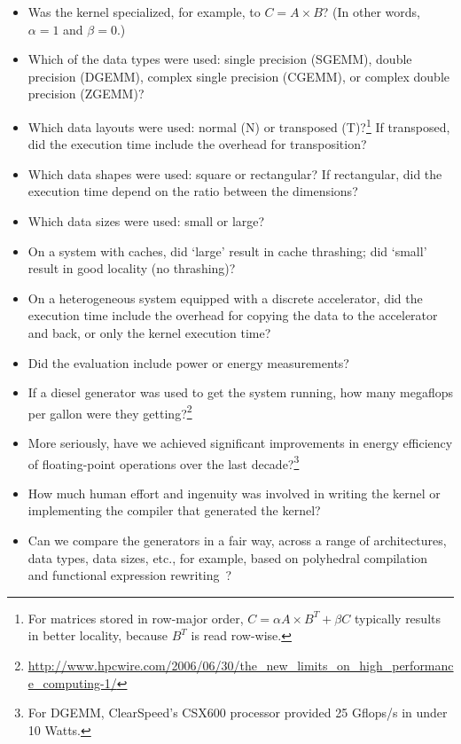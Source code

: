 \documentclass{acm_proc_article-sp} %
\begin{document}
\begin{itemize}
%
\item Was the kernel specialized, for example, to $C = A \times B$? (In other
words, $\alpha=1$ and $\beta=0$.) 
%
\item Which of the data types were used: single precision (SGEMM), double
precision (DGEMM), complex single precision (CGEMM), or complex double
precision (ZGEMM)?
%
\item Which data layouts were used: normal (N) or transposed (T)?\footnote{For
matrices stored in row-major order, $C = \alpha A \times B^{T} + \beta C$
typically results in better locality, because $B^{T}$ is read row-wise.} If
transposed, did the execution time include the overhead for transposition?
%
\item Which data shapes were used: square or rectangular? If rectangular, did
the execution time depend on the ratio between the dimensions? 
%
\item Which data sizes were used: small or large?
%
\item On a system with caches, did `large' result in cache thrashing; did
`small' result in good locality (no thrashing)?
%
\item On a heterogeneous system equipped with a discrete accelerator, did the
execution time include the overhead for copying the data to the accelerator and
back, or only the kernel execution time?
%
\item Did the evaluation include power or energy measurements?
%
\item If a diesel generator was used to get the system running, how many
megaflops per gallon were they
getting?\footnote{\url{http://www.hpcwire.com/2006/06/30/the_new_limits_on_high_performance_computing-1/}}
%
\item More seriously, have we achieved significant improvements in energy
efficiency of floating-point operations over the last decade?\footnote{For
DGEMM, ClearSpeed's CSX600 processor provided 25 Gflops/s in under 10 Watts.}
%
\item How much human effort and ingenuity was involved in writing the kernel or
implementing the compiler that generated the kernel?
%
\item Can we compare the generators in a fair way, across a range of
architectures, data types, data sizes, etc., for example, based on polyhedral
compilation~\cite{Beaugnon:2014} and functional expression
rewriting~\cite{Steuwer:2015}?
%
\end{itemize}
\end{document}
